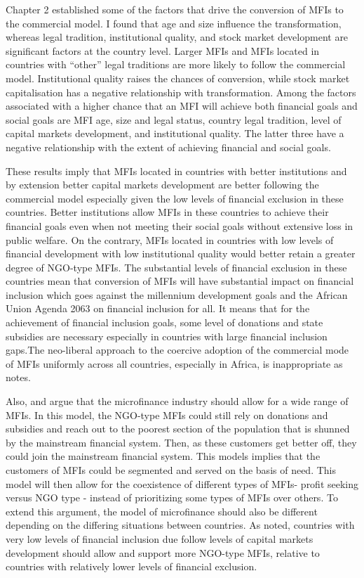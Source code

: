 \documentclass[a4paper, nobind]{templates/ociamthesis}
\begin{document}
Chapter 2 established some of the factors that drive the conversion of MFIs to the commercial model. I found that age and size influence the transformation, whereas legal tradition, institutional quality, and stock market development are significant factors at the country level. Larger MFIs and MFIs located in countries with ``other'' legal traditions are more likely to follow the commercial model. Institutional quality raises the chances of conversion, while stock market capitalisation has a negative relationship with transformation. Among the factors associated with a higher chance that an MFI will achieve both financial goals and social goals are MFI age, size and legal status, country legal tradition, level of capital markets development, and institutional quality. The latter three have a negative relationship with the extent of achieving financial and social goals.

These results imply that MFIs located in countries with better institutions and by extension better capital markets development are better following the commercial model especially given the low levels of financial exclusion in these countries. Better institutions allow MFIs in these countries to achieve their financial goals even when not meeting their social goals without extensive loss in public welfare. On the contrary, MFIs located in countries with low levels of financial development with low institutional quality would better retain a greater degree of NGO-type MFIs. The substantial levels of financial exclusion in these countries mean that conversion of MFIs will have substantial impact on financial inclusion which goes against the millennium development goals and the African Union Agenda 2063 on financial inclusion for all. It means that for the achievement of financial inclusion goals, some level of donations and state subsidies are necessary especially in countries with large financial inclusion gaps.The neo-liberal approach to the coercive adoption of the commercial mode of MFIs uniformly across all countries, especially in Africa, is inappropriate as \textcite{bateman2010doesn} notes.

Also, \textcite{morduch1999microfinance} and \textcite{morduch2000microfinance} argue that the microfinance industry should allow for a wide range of MFIs. In this model, the NGO-type MFIs could still rely on donations and subsidies and reach out to the poorest section of the population that is shunned by the mainstream financial system. Then, as these customers get better off, they could join the mainstream financial system. This models implies that the customers of MFIs could be segmented and served on the basis of need. This model will then allow for the coexistence of different types of MFIs- profit seeking versus NGO type - instead of prioritizing some types of MFIs over others. To extend this argument, the model of microfinance should also be different depending on the differing situations between countries. As noted, countries with very low levels of financial inclusion due follow levels of capital markets development should allow and support more NGO-type MFIs, relative to countries with relatively lower levels of financial exclusion.
\end{document}
